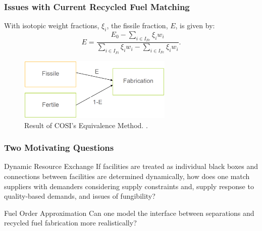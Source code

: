 \begin{frame}[ctb!]
  \frametitle{Issues with Current Recycled Fuel Matching} 
  
  With isotopic weight fractions, $\xi_i$, the fissile fraction, $E$, is given
  by:
  \begin{equation}
    E = \frac{E_0 - \sum_{i \in I_{Fe}} \xi_i w_i}
    {\sum_{i \in I_{Fi}} \xi_i w_i - \sum_{i \in I_{Fe}} \xi_i w_i}.
  \end{equation}

  \begin{figure}
    \includegraphics[height=3cm]{./images/equiv.eps}
    \caption{Result of COSI's Equivalence Method. \cite{meyer_new_2009}.}
  \end{figure}
\end{frame}
  
\begin{frame}[ctb!]
  \frametitle{Two Motivating Questions}

  \begin{block}{Dynamic Resource Exchange}
    If facilities are treated as individual black boxes and connections between
    facilities are determined dynamically, how does one match suppliers with
    demanders considering supply constraints and, supply response to
    quality-based demands, and issues of fungibility?
  \end{block}

  \pause

  \begin{block}{Fuel Order Approximation}
    Can one model the interface between separations and recycled fuel
    fabrication more realistically?
  \end{block}

\end{frame}
